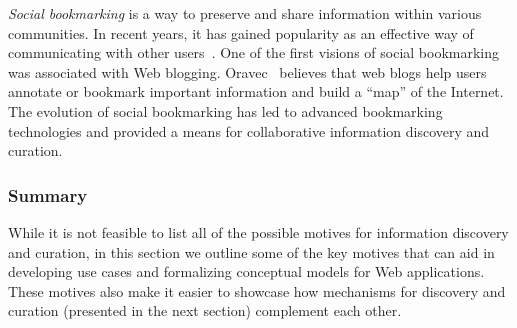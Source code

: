 \documentclass{sigchi}
\begin{document}
{{\textit{Social bookmarking} is a way to preserve and share information within various communities. In recent years, it has gained popularity as an effective way of communicating with other users~\cite{estelles2010social}. One of the first visions of social bookmarking was associated with Web blogging. Oravec~\cite{oravec2002bookmarking} believes that web blogs help users annotate or bookmark important information and build a ``map'' of the Internet. The evolution of social bookmarking has led to advanced bookmarking technologies and provided a means for collaborative information discovery and curation. 
}
{\subsubsection{Summary}
While it is not feasible to list all of the possible motives for information discovery and curation, in this section we outline some of the key motives that can aid in developing use cases and formalizing conceptual models for Web applications. These motives also make it easier to showcase how mechanisms for discovery and curation (presented in the next section) complement each other.
} 
}
\end{document}
